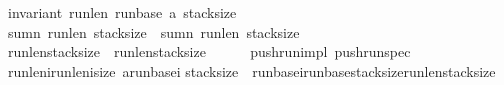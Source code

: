 \begin{isabellebody}
{\isacharparenleft}invariant\ {\isasymacute}run{\isacharunderscore}len\ {\isasymacute}run{\isacharunderscore}base\ {\isasymacute}a\ {\isasymacute}stack{\isacharunderscore}size{\isacharparenright}\ {\isasymand}\isanewline
{\isacharparenleft}sumn\ {\isasymacute}run{\isacharunderscore}len\ {\isasymacute}stack{\isacharunderscore}size\ {\isacharequal}\ sumn\ \isactrlbsup {\isasymsigma}\isactrlesup run{\isacharunderscore}len\ \isactrlbsup {\isasymsigma}\isactrlesup stack{\isacharunderscore}size{\isacharparenright}\ {\isasymand}\isanewline
{\isacharparenleft}{\isasymacute}run{\isacharunderscore}len{\isacharbang}{\isacharparenleft}{\isasymacute}stack{\isacharunderscore}size{\isacharminus}{}{\isacharparenright}\ {\isasymge}\ \isactrlbsup {\isasymsigma}\isactrlesup run{\isacharunderscore}len{\isacharbang}{\isacharparenleft}\isactrlbsup {\isasymsigma}\isactrlesup stack{\isacharunderscore}size{\isacharminus}{}{\isacharparenright}{\isacharparenright}\ {\isasymrbrace}{\isachardoublequoteclose}\isanewline
%
\isadelimproof
\ \ %
\endisadelimproof
%
\isatagproof
{}\isamarkupfalse%
%
\endisatagproof
{\isafoldproof}%
%
\isadelimproof
\isanewline
%
\endisadelimproof
\isanewline
\isanewline
\isanewline
{}\isamarkupfalse%
\ {\isacharparenleft}\ push{\isacharunderscore}run{\isacharunderscore}impl{\isacharparenright}\ push{\isacharunderscore}run{\isacharunderscore}spec{\isacharcolon}\isanewline
{\isachardoublequoteopen}{\isasymforall}{\isasymsigma}{\isachardot}\ {\isasymGamma}{\isasymturnstile}\ {\isasymlbrace}{\isasymsigma}{\isachardot}\ \isanewline
{\isacharparenleft}{\isasymacute}run{\isacharunderscore}len{\isacharunderscore}i{\isachargreater}{}{\isacharparenright}{\isasymand}{\isacharparenleft}{\isasymacute}run{\isacharunderscore}len{\isacharunderscore}i{\isasymle}size\ {\isasymacute}a{\isacharparenright}{\isasymand}{\isacharparenleft}{\isasymacute}run{\isacharunderscore}base{\isacharunderscore}i{\isasymge}{}{\isacharparenright}{\isasymand}\isanewline
{\isacharparenleft}{\isasymacute}stack{\isacharunderscore}size{\isachargreater}{}\ {\isasymlongrightarrow}\ {\isacharparenleft}{\isasymacute}run{\isacharunderscore}base{\isacharunderscore}i{\isacharequal}{\isasymacute}run{\isacharunderscore}base{\isacharbang}{\isacharparenleft}{\isasymacute}stack{\isacharunderscore}size{\isacharminus}{}{\isacharparenright}{\isacharplus}{\isasymacute}run{\isacharunderscore}len{\isacharbang}{\isacharparenleft}{\isasymacute}stack{\isacharunderscore}size{\isacharminus}{}{\isacharparenright}{\isacharparenright}{\isacharparenright}\ {\isasymand}\isanewline

\end{isabellebody}
